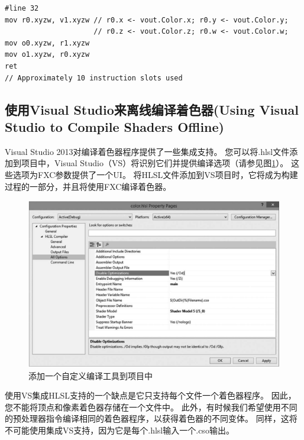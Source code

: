 \documentclass[11pt,a4paper,oldfontcommands]{memoir}
\begin{document}
{\begin{flushleft}
\begin{lstlisting}
#line 32
mov r0.xyzw, v1.xyzw // r0.x <- vout.Color.x; r0.y <- vout.Color.y;
                     // r0.z <- vout.Color.z; r0.w <- vout.Color.w;
mov o0.xyzw, r1.xyzw
mov o1.xyzw, r0.xyzw
ret
// Approximately 10 instruction slots used
\end{lstlisting}
\end{flushleft}

\subsection{使用Visual Studio来离线编译着色器(Using Visual Studio to Compile Shaders Offline)}
\begin{flushleft}
Visual Studio 2013对编译着色器程序提供了一些集成支持。 您可以将.hlsl文件添加到项目中，Visual Studio（VS）将识别它们并提供编译选项（请参见图\ref{fig:6-6}）。 这些选项为FXC参数提供了一个UI。 将HLSL文件添加到VS项目时，它将成为构建过程的一部分，并且将使用FXC编译着色器。\\
\begin{figure}[h]
    \includegraphics[width=\textwidth]{6-6}
    \centering
    \caption{添加一个自定义编译工具到项目中}
    \label{fig:6-6}
\end{figure}

使用VS集成HLSL支持的一个缺点是它只支持每个文件一个着色器程序。 因此，您不能将顶点和像素着色器存储在一个文件中。 此外，有时候我们希望使用不同的预处理器指令编译相同的着色器程序，以获得着色器的不同变体。 同样，这将不可能使用集成VS支持，因为它是每个.hlsl输入一个.cso输出。
\end{flushleft}

}
\end{document}
